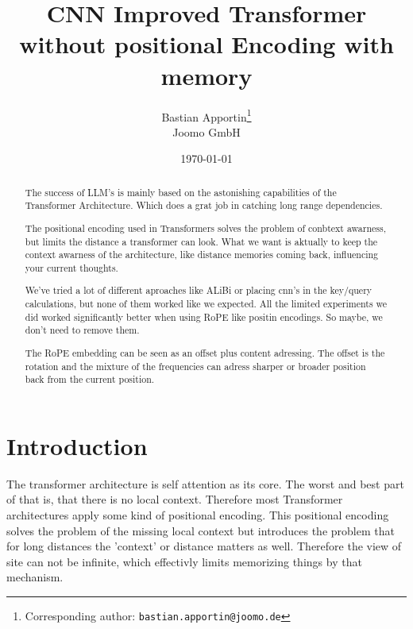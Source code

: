 \documentclass[11pt]{article}
\title{CNN Improved Transformer without positional Encoding with memory}
\author{
  Bastian Apportin\thanks{Corresponding author: \texttt{bastian.apportin@joomo.de}} \\
  \normalsize Joomo GmbH \\
}
\date{\today}
\begin{document}
\maketitle

\begin{abstract}
The success of LLM's is mainly based on the astonishing capabilities of the Transformer Architecture. 
Which does a grat job in catching long range dependencies.

The positional encoding used in Transformers solves the problem of conbtext awarness, but limits the distance a transformer can look. What we want is aktually 
to keep the context awarness of the architecture, like distance memories coming back, influencing your current thoughts.

We've tried a lot of different aproaches like ALiBi or placing cnn's in the key/query calculations, but none of them worked like we expected. All the limited
experiments we did worked significantly better when using RoPE like positin encodings. So maybe, we don't need to remove them.

The RoPE embedding can be seen as an offset plus content adressing. The offset is the rotation and the mixture of the frequencies can adress sharper or broader position
back from the current position. 



\end{abstract}


\section{Introduction}

The transformer architecture is self attention as its core. The worst and best part of that is, that there is no local context. Therefore 
most Transformer architectures apply some kind of positional encoding. This positional encoding solves the problem of the missing local context
but introduces the problem that for long distances the 'context' or distance matters as well. Therefore the view of site can not be infinite, which 
effectivly limits memorizing things by that mechanism.
\end{document}
